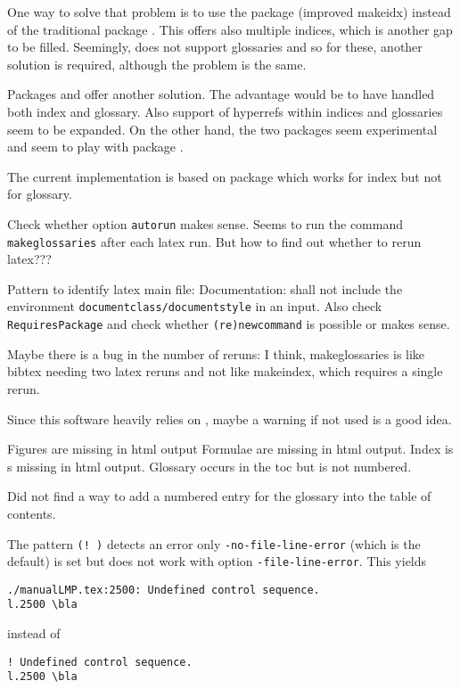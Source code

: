 \documentclass[a4paper,12pt,german,english]{book}
\begin{document}
One way to solve that problem is to use the package  
(improved makeidx) instead of the traditional package . 
This offers also multiple indices, which is another gap to be filled. 
Seemingly,  does not support glossaries 
and so for these, another solution is required, 
although the problem is the same. 

Packages  and  
offer another solution. 
The advantage would be to have handled both index and glossary. 
Also support of hyperrefs within indices and glossaries seem to be expanded. 
On the other hand, the two packages seem experimental 
and seem to play with package . 

The current implementation is based on package  
which works for index but not for glossary. 

Check whether  option \texttt{autorun} makes sense. 
Seems to run the command \texttt{makeglossaries} after each latex run. 
But how to find out whether to rerun latex??? 

Pattern to identify latex main file: 
Documentation: shall not include the environment 
\texttt{documentclass/documentstyle} in an input. 
Also check \texttt{RequiresPackage} 
and check whether \texttt{(re)newcommand} is possible %
or makes sense. 

Maybe there is a bug in the number of reruns: 
I think, makeglossaries is like bibtex needing two latex reruns 
and not like makeindex, which requires a single rerun. 

Since this software heavily relies on , 
maybe a warning if not used is a good idea. 

Figures are missing in html output 
Formulae are missing in html output. 
Index is s missing in html output. 
Glossary occurs in the toc but is not numbered. 

Did not find a way to add a numbered entry for the glossary 
into the table of contents. 

The pattern \texttt{(!\ )} detects an error only %
\texttt{-no-file-line-error} (which is the default) is set 
but does not work with option \texttt{-file-line-error}. 
This yields 
%
\begin{verbatim}
./manualLMP.tex:2500: Undefined control sequence.
l.2500 \bla
\end{verbatim}
%
instead of 
%
\begin{verbatim}
! Undefined control sequence.
l.2500 \bla
\end{verbatim}
\end{document}
